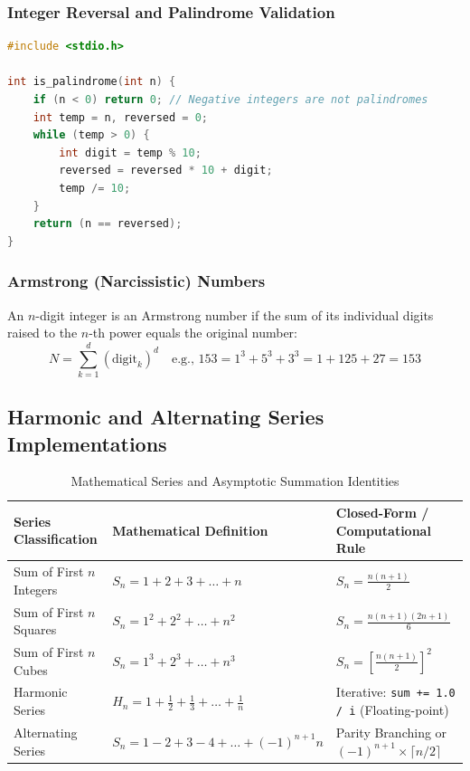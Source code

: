 \subsubsection{Integer Reversal and Palindrome Validation}
\begin{lstlisting}[language=C]
#include <stdio.h>

int is_palindrome(int n) {
    if (n < 0) return 0; // Negative integers are not palindromes
    int temp = n, reversed = 0;
    while (temp > 0) {
        int digit = temp % 10;
        reversed = reversed * 10 + digit;
        temp /= 10;
    }
    return (n == reversed);
}
\end{lstlisting}

\subsubsection{Armstrong (Narcissistic) Numbers}
An $n$-digit integer is an Armstrong number if the sum of its individual digits raised to the $n$-th power equals the original number:
\[
N = \sum_{k=1}^{d} (\text{digit}_k)^d \quad \text{e.g., } 153 = 1^3 + 5^3 + 3^3 = 1 + 125 + 27 = 153
\]

\subsection{Harmonic and Alternating Series Implementations}
\begin{table}[htbp]
\centering
\small
\begin{tabularx}{\textwidth}{l X l}
\toprule
\textbf{Series Classification} & \textbf{Mathematical Definition} & \textbf{Closed-Form / Computational Rule} \\
\midrule
Sum of First $n$ Integers & $S_n = 1 + 2 + 3 + \dots + n$ & $S_n = \frac{n(n+1)}{2}$ \\
Sum of First $n$ Squares & $S_n = 1^2 + 2^2 + \dots + n^2$ & $S_n = \frac{n(n+1)(2n+1)}{6}$ \\
Sum of First $n$ Cubes & $S_n = 1^3 + 2^3 + \dots + n^3$ & $S_n = \left[\frac{n(n+1)}{2}\right]^2$ \\
Harmonic Series & $H_n = 1 + \frac{1}{2} + \frac{1}{3} + \dots + \frac{1}{n}$ & Iterative: \texttt{sum += 1.0 / i} (Floating-point) \\
Alternating Series & $S_n = 1 - 2 + 3 - 4 + \dots + (-1)^{n+1}n$ & Parity Branching or $(-1)^{n+1} \times \lceil n/2 \rceil$ \\
\bottomrule
\end{tabularx}
\caption{Mathematical Series and Asymptotic Summation Identities}
\label{tab:mathematical_series}
\end{table}


